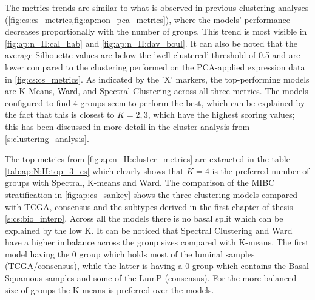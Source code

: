 The metrics trends are similar to what is observed in previous clustering analyses (\cref{fig:cs:cs_metrics,fig:ap:non_pca_metrics}), where the models' performance decreases proportionally with the number of groups. This trend is most visible in \cref{fig:ap:n_II:cal_hab} and \cref{fig:ap:n_II:dav_boul}. It can also be noted that the average Silhouette values are below the 'well-clustered' threshold of 0.5 and are lower compared to the clustering performed on the PCA-applied expression data in \cref{fig:cs:cs_metrics}. As indicated by the 'X' markers, the top-performing models are K-Means, Ward, and Spectral Clustering across all three metrics. The models configured to find 4 groups seem to perform the best, which can be explained by the fact that this is closest to $K=2,3$, which have the highest scoring values; this has been discussed in more detail in the cluster analysis from \cref{s:clustering_analysis}.

The top metrics from \cref{fig:ap:n_II:cluster_metrics} are extracted in the table \cref{tab:ap:N:II:top_3_cs} which clearly shows that $K=4$ is the preferred number of groups with Spectral, K-means and Ward. The comparison of the MIBC stratification in \cref{fig:ap:cs_sankey} shows the three clustering models compared with TCGA, consensus and the subtypes derived in the first chapter of thesis \cref{s:cs:bio_interp}. Across all the models there is no basal split which can be explained by the low K. It can be noticed that Spectral Clustering and Ward have a higher imbalance across the group sizes compared with K-means. The first model having the 0 group which holds most of the luminal samples (TCGA/consensus), while the latter is having a 0 group which contains the Basal Squamous samples and some of the LumP (consensus). For the more balanced size of groups the K-means is preferred over the models.

